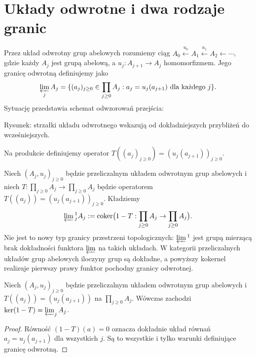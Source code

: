 \section{Układy odwrotne i dwa rodzaje granic}
\begin{definicja}
Przez układ odwrotny grup abelowych rozumiemy ciąg
$A_0\xleftarrow{u_0}A_1\xleftarrow{u_1}A_2\leftarrow\cdots$,
gdzie każdy $A_j$ jest grupą abelową, a $u_j:A_{j+1}\to A_j$
homomorfizmem. Jego granicę odwrotną definiujemy jako
\[
\varprojlim_jA_j=
\{(a_j)_{j\ge0}\in\prod_{j\ge0}A_j:
 a_j=u_j(a_{j+1})\text{ dla każdego }j\}.
\]
Sytuację przedstawia schemat odwzorowań przejścia:
\begin{center}
\par\smallskip\small Rysunek: strzałki układu odwrotnego wskazują od dokładniejszych przybliżeń do wcześniejszych.
\end{center}
Na produkcie definiujemy operator
$T((a_j)_{j\ge0})=(u_j(a_{j+1}))_{j\ge0}$.
\end{definicja}
\begin{definicja}
Niech $(A_j,u_j)_{j\ge0}$ będzie przeliczalnym
układem odwrotnym grup abelowych i niech
$T:\prod_{j\ge0}A_j\to\prod_{j\ge0}A_j$
będzie operatorem
$T((a_j))=(u_j(a_{j+1}))_{j\ge0}$.
Kładziemy
\[
\varprojlim{}^1_jA_j:=
\operatorname{coker}\bigl(1-T:\prod_{j\ge0}A_j\to
\prod_{j\ge0}A_j\bigr).
\]
Nie jest to nowy typ granicy przestrzeni topologicznych:
$\varprojlim{}^1$ jest grupą mierzącą brak dokładności
funktora $\varprojlim$ na takich układach.
W kategorii przeliczalnych układów grup abelowych
iloczyny grup są dokładne, a powyższy kokernel
realizuje pierwszy prawy funktor pochodny granicy odwrotnej.
\end{definicja}
\begin{lemat}
Niech $(A_j,u_j)_{j\ge0}$ będzie przeliczalnym
układem odwrotnym grup abelowych i
$T((a_j))=(u_j(a_{j+1}))$ na $\prod_{j\ge0}A_j$.
Wówczas zachodzi
$\ker(1-T)=\varprojlim_j A_j$.
\end{lemat}
\begin{proof}
Równość $(1-T)(a)=0$ oznacza dokładnie układ równań
$a_j=u_j(a_{j+1})$ dla wszystkich $j$. Są to wszystkie i tylko
warunki definiujące granicę odwrotną.
\end{proof}

